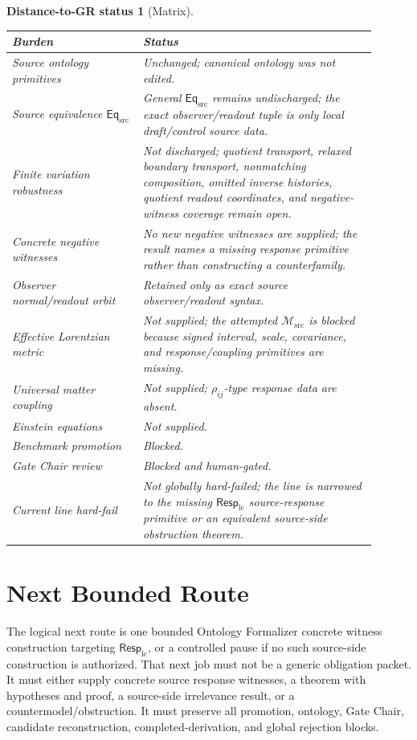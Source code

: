 \documentclass[11pt]{article}
\newcommand{\EqSrc}{\mathsf{Eq}_{\mathrm{src}}}
\newcommand{\Msrc}{\mathcal{M}_{\mathrm{src}}}
\newcommand{\RespLC}{\mathsf{Resp}_{\mathrm{lc}}}
\newtheorem{distancestatus}{Distance-to-GR status}
\begin{document}
\begin{distancestatus}[Matrix]
\begin{center}
\begin{tabular}{p{0.32\linewidth}p{0.58\linewidth}}
\textbf{Burden} & \textbf{Status} \\
\hline
Source ontology primitives & Unchanged; canonical ontology was not edited. \\
Source equivalence \(\EqSrc\) & General \(\EqSrc\) remains undischarged; the exact observer/readout tuple is only local draft/control source data. \\
Finite variation robustness & Not discharged; quotient transport, relaxed boundary transport, nonmatching composition, omitted inverse histories, quotient readout coordinates, and negative-witness coverage remain open. \\
Concrete negative witnesses & No new negative witnesses are supplied; the result names a missing response primitive rather than constructing a counterfamily. \\
Observer normal/readout orbit & Retained only as exact source observer/readout syntax. \\
Effective Lorentzian metric & Not supplied; the attempted \(\Msrc\) is blocked because signed interval, scale, covariance, and response/coupling primitives are missing. \\
Universal matter coupling & Not supplied; \(\rho_{ij}\)-type response data are absent. \\
Einstein equations & Not supplied. \\
Benchmark promotion & Blocked. \\
Gate Chair review & Blocked and human-gated. \\
Current line hard-fail & Not globally hard-failed; the line is narrowed to the missing \(\RespLC\) source-response primitive or an equivalent source-side obstruction theorem. \\
\end{tabular}
\end{center}
\end{distancestatus}

\section{Next Bounded Route}

The logical next route is one bounded Ontology Formalizer concrete
witness construction targeting \(\RespLC\), or a controlled pause if
no such source-side construction is authorized. That next job must not
be a generic obligation packet. It must either supply concrete source
response witnesses, a theorem with hypotheses and proof, a source-side
irrelevance result, or a countermodel/obstruction. It must preserve
all promotion, ontology, Gate Chair, candidate reconstruction,
completed-derivation, and global rejection blocks.
\end{document}
